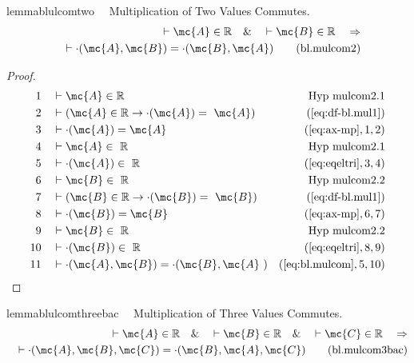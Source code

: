 \begin{restatable}{lemma}{blulcomtwo}~~ Multiplication of Two Values Commutes.
\begin{align}
\vdash \mc{A} \in \mathbb{R}\quad\&\quad \vdash \mc{B} \in
    \mathbb{R}\quad\Rightarrow \notag \\ 
	\quad \vdash \cdot( \mc{A} , \mc{B} ) = \cdot(
    \mc{B} , \mc{A} )\label{eq:bl.mulcom2}\tag{bl.mulcom2}
\end{align}
\end{restatable}

\begin{proof}
\begin{align}
  1 &&  & \vdash \mc{A} \in \mathbb{R}&\text{Hyp~mulcom2.1}\notag%
  \\ 2 &&  & \vdash ( \mc{A} \in \mathbb{R} \rightarrow \cdot( \mc{A} ) =
     ~\mc{A} )&(\mbox{\ref{eq:df-bl.mul1}})\notag
  \\ 3 &&  & \vdash \cdot( \mc{A} ) = \mc{A}&(\mbox{\ref{eq:ax-mp}},1,2)\notag
  \\ 4 &&  & \vdash \mc{A} \in
     ~\mathbb{R}&\text{Hyp~mulcom2.1}\notag%
  \\ 5 &&  & \vdash \cdot( \mc{A} ) \in
     ~\mathbb{R}&(\mbox{\ref{eq:eqeltri}},3,4)\notag
  \\ 6 &&  & \vdash \mc{B} \in
     ~\mathbb{R}&\text{Hyp~mulcom2.2}\notag%
  \\ 7 &&  & \vdash ( \mc{B} \in \mathbb{R} \rightarrow \cdot( \mc{B} ) =
     ~\mc{B} )&(\mbox{\ref{eq:df-bl.mul1}})\notag
  \\ 8 &&  & \vdash \cdot( \mc{B} ) = \mc{B}&(\mbox{\ref{eq:ax-mp}},6,7)\notag
  \\ 9 &&  & \vdash \mc{B} \in
     ~\mathbb{R}&\text{Hyp~mulcom2.2}\notag%
  \\ 10 &&  & \vdash \cdot( \mc{B} ) \in
     ~\mathbb{R}&(\mbox{\ref{eq:eqeltri}},8,9)\notag
  \\ 11 &&  & \vdash \cdot( \mc{A} , \mc{B} ) = \cdot( \mc{B} , \mc{A}
     ~)&(\mbox{\ref{eq:bl.mulcom}},5,10)\notag
\end{align}
\end{proof}

\begin{restatable}{lemma}{blulcomthreebac}~~ Multiplication of Three Values
Commutes.
\begin{align}
\vdash \mc{A} \in \mathbb{R}\quad\&\quad \vdash \mc{B} \in
    \mathbb{R}\quad\&\quad \vdash \mc{C} \in \mathbb{R}\quad\Rightarrow \notag \\ 
	\quad
    \vdash \cdot( \mc{A} , \mc{B} , \mc{C} ) = \cdot( \mc{B} , \mc{A} , \mc{C}
    )\label{eq:bl.mulcom3bac}\tag{bl.mulcom3bac}
\end{align}
\end{restatable}

